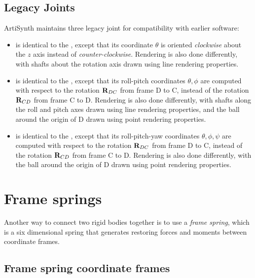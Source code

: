\subsection{Legacy Joints}

ArtiSynth maintains three legacy joint for compatibility with earlier
software:

\begin{itemize}

\item {} is identical
to the , except that
its coordinate $\theta$ is oriented {\it clockwise} about the $z$ axis
instead of {\it counter-clockwise}. Rendering is also done
differently, with shafts about the rotation axis drawn using
line rendering properties.

\item {} is identical
to the , except
that its roll-pitch coordinates $\theta, \phi$ are computed with
respect to the rotation ${\bf R}_{DC}$ from frame D to C, instead of the
rotation ${\bf R}_{CD}$ from frame C to D. Rendering is also done
differently, with shafts along the roll and pitch axes drawn
using line rendering properties, and the ball around the
origin of D drawn using point rendering properties.

\item {}
is identical to
the , except that
its roll-pitch-yaw coordinates $\theta, \phi, \psi$ are computed with
respect to the rotation ${\bf R}_{DC}$ from frame D to C, instead of the
rotation ${\bf R}_{CD}$ from frame C to D. Rendering is also done
differently, with the ball around the origin of D drawn using point
rendering properties.

\end{itemize}

\section{Frame springs}
\label{FrameSprings:sec}

Another way to connect two rigid bodies together is to use a {\it
frame spring}, which is a six dimensional spring that generates
restoring forces and moments between coordinate frames.

\subsection{Frame spring coordinate frames}


